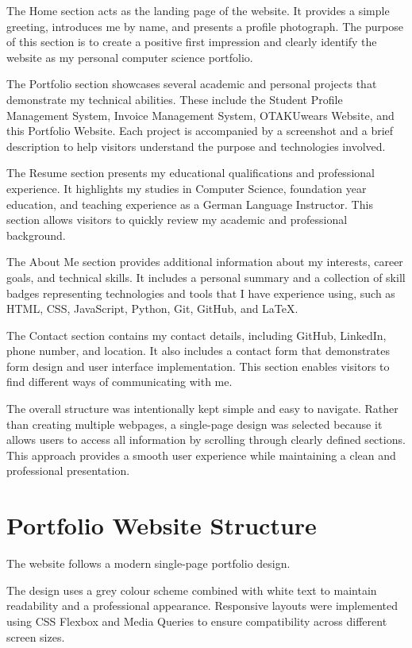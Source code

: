 \documentclass[12pt,a4paper]{article}
\begin{document}
The Home section acts as the landing page of the website. It provides a 
simple greeting, introduces me by name, and presents a profile photograph. 
The purpose of this section is to create a positive first impression and 
clearly identify the website as my personal computer science portfolio.

The Portfolio section showcases several academic and personal projects that 
demonstrate my technical abilities. These include the Student Profile 
Management System, Invoice Management System, OTAKUwears Website, and this 
Portfolio Website. Each project is accompanied by a screenshot and a brief 
description to help visitors understand the purpose and technologies 
involved.

The Resume section presents my educational qualifications and professional 
experience. It highlights my studies in Computer Science, foundation year 
education, and teaching experience as a German Language Instructor. This 
section allows visitors to quickly review my academic and professional 
background.

The About Me section provides additional information about my interests, 
career goals, and technical skills. It includes a personal summary and a 
collection of skill badges representing technologies and tools that I have 
experience using, such as HTML, CSS, JavaScript, Python, Git, GitHub, and 
LaTeX.

The Contact section contains my contact details, including GitHub, 
LinkedIn, phone number, and location. It also includes a contact form that 
demonstrates form design and user interface implementation. This section 
enables visitors to find different ways of communicating with me.


The overall structure was intentionally kept simple and easy to navigate. 
Rather than creating multiple webpages, a single-page design was selected 
because it allows users to access all information by scrolling through 
clearly defined sections. This approach provides a smooth user experience 
while maintaining a clean and professional presentation.




\section{Portfolio Website Structure}

The website follows a modern single-page portfolio design.

The design uses a grey colour scheme combined with white text to maintain readability and a professional appearance. Responsive layouts were implemented using CSS Flexbox and Media Queries to ensure compatibility across different screen sizes.
\end{document}
